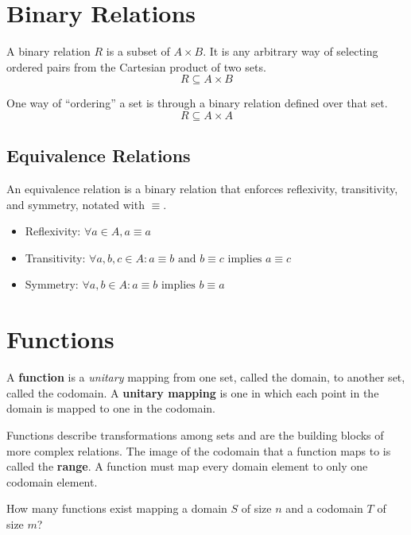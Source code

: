 \documentclass[11pt]{article}
\begin{document}
\section{Binary Relations}
	A binary relation $R$ is a subset of $A\times B$. It is any arbitrary way of selecting ordered pairs from the Cartesian product of two sets.
	\begin{equation}
		R\subseteq A\times B
	\end{equation}
	
	One way of ``ordering'' a set is through a binary relation defined over that set.
	\begin{equation}
		R\subseteq A\times A
	\end{equation}
	
	\subsection{Equivalence Relations}
		An equivalence relation is a binary relation that enforces reflexivity, transitivity, and symmetry, notated with $\equiv$.
		\begin{itemize}
			\item Reflexivity: $\forall a\in A, a\equiv a$
			\item Transitivity: $\forall a,b,c\in A:a\equiv b \text{ and } b\equiv c \text{ implies } a\equiv c$
			\item Symmetry: $\forall a,b\in A: a\equiv b \text{ implies } b\equiv a$
		\end{itemize}
		
\section{Functions}
	A \textbf{function} is a \textit{unitary} mapping from one set, called the domain, to another set, called the codomain. A \textbf{unitary mapping} is one in which each point in the domain is mapped to one in the codomain.
	
	Functions describe transformations among sets and are the building blocks of more complex relations. The image of the codomain that a function maps to is called the \textbf{range}. A function must map every domain element to only one codomain element.
	
	How many functions exist mapping a domain $S$ of size $n$ and a codomain $T$ of size $m$?

%		
%		


\end{document}

